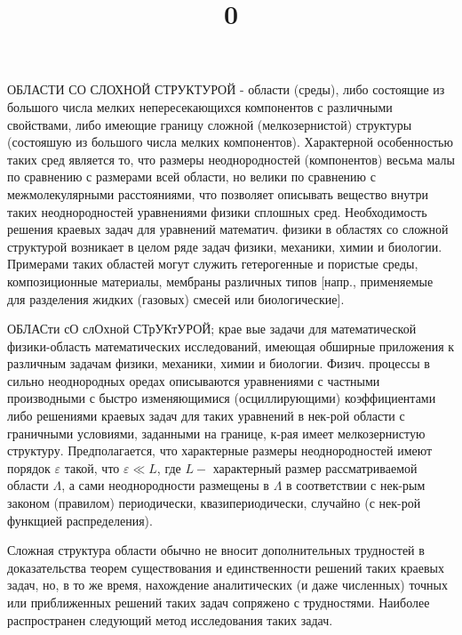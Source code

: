 \documentclass[10pt]{article}
\title{0 }
\author{}
\date{}
\begin{document}
\maketitle

ОБЛАСТИ СО СЛОХНОЙ СТРУКТУРОЙ - области (среды), либо состоящие из большого числа мелких непересекающихся компонентов с различными свойствами, либо имеющие границу сложной (мелкозернистой) структуры (состояшую из большого числа мелких компонентов). Характерной особенностью таких сред является то, что размеры неоднородностей (компонентов) весьма малы по сравнению с размерами всей области, но велики по сравнению с межмолекулярными расстояниями, что позволяет описывать вещество внутри таких неоднородностей уравнениями физики сплошных сред. Необходимость решения краевых задач для уравнений математич. физики в областях со сложной структурой возникает в целом ряде задач физики, механики, химии и биологии. Примерами таких областей могут служить гетерогенные и пористые среды, композиционные материалы, мембраны различных типов [напр., применяемые для разделения жидких (газовых) смесей или биологические].



ОБЛАСти сО слОхной СТрУКтУРОЙ; крае вые задачи для математической физики-область математических исследований, имеющая обширные приложения к различным задачам физики, механики, химии и биологии. Физич. процессы в сильно неоднородных оредах описываются уравнениями с частными производными с быстро изменяющимися (осциллирующими) коэффициентами либо решениями краевых задач для таких уравнений в нек-рой области с граничными условиями, заданными на границе, к-рая имеет мелкозернистую структуру. Предполагается, что характерные размеры неоднородностей имеют порядок $\varepsilon$ такой, что $\varepsilon \ll L$, где $L-$ характерный размер рассматриваемой области $\Lambda$, а сами неоднородности размещены в $\Lambda$ в соответствии с нек-рым законом (правилом) периодически, квазипериодически, случайно (с нек-рой функщией распределения).



Сложная структура области обычно не вносит дополнительных трудностей в доказательства теорем существования и единственности решений таких краевых задач, но, в то же время, нахождение аналитических (и даже численных) точных или приближенных решений таких задач сопряжено с трудностями. Наиболее распространен следующий метод исследования таких задач.
\end{document}
